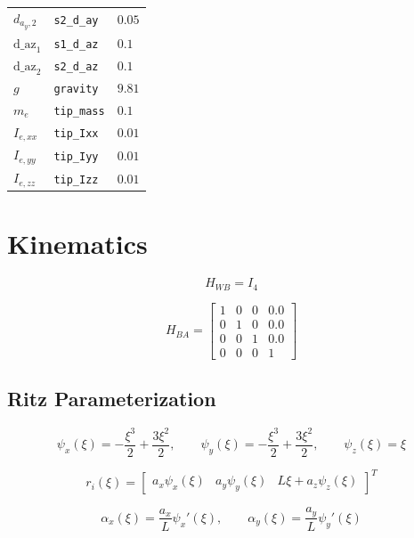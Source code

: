 \documentclass[11pt]{article}
\begin{document}
\begin{longtable}{lll}
$d_{a_y,2}$ & \texttt{s2\_d\_ay} & $0.05$ \\
$\mathrm{d\_az}_{1}$ & \texttt{s1\_d\_az} & $0.1$ \\
$\mathrm{d\_az}_{2}$ & \texttt{s2\_d\_az} & $0.1$ \\
$g$ & \texttt{gravity} & $9.81$ \\
$m_e$ & \texttt{tip\_mass} & $0.1$ \\
$I_{e,xx}$ & \texttt{tip\_Ixx} & $0.01$ \\
$I_{e,yy}$ & \texttt{tip\_Iyy} & $0.01$ \\
$I_{e,zz}$ & \texttt{tip\_Izz} & $0.01$ \\
\hline
\end{longtable}

\section{Kinematics}
\begin{equation}
H_{WB}=I_4
\end{equation}

\begin{equation}
H_{BA}=\begin{bmatrix}1 & 0 & 0 & 0.0\\0 & 1 & 0 & 0.0\\0 & 0 & 1 & 0.0\\0 & 0 & 0 & 1\end{bmatrix}\label{eq:mount-transform}
\end{equation}

\subsection{Ritz Parameterization}
\begin{equation}
\psi_x(\xi)=- \frac{\xi^{3}}{2} + \frac{3 \xi^{2}}{2},\qquad\psi_y(\xi)=- \frac{\xi^{3}}{2} + \frac{3 \xi^{2}}{2},\qquad\psi_z(\xi)=\xi
\end{equation}

\begin{equation}
r_i(\xi)=\begin{bmatrix}a_x\psi_x(\xi)&a_y\psi_y(\xi)&L\xi+a_z\psi_z(\xi)\end{bmatrix}^T
\end{equation}

\begin{equation}
\alpha_x(\xi)=\frac{a_x}{L}\psi_x'(\xi),\qquad \alpha_y(\xi)=\frac{a_y}{L}\psi_y'(\xi)
\end{equation}
\end{document}
